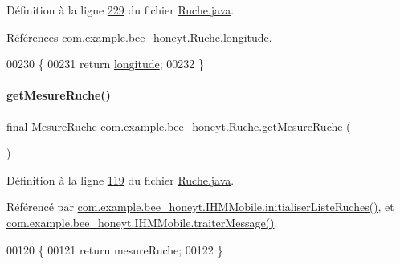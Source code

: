 Définition à la ligne \hyperlink{_ruche_8java_source_l00229}{229} du fichier \hyperlink{_ruche_8java_source}{Ruche.\+java}.



Références \hyperlink{_ruche_8java_source_l00035}{com.\+example.\+bee\+\_\+honeyt.\+Ruche.\+longitude}.


\begin{DoxyCode}
00230     \{
00231         \textcolor{keywordflow}{return} \hyperlink{classcom_1_1example_1_1bee__honeyt_1_1_ruche_aaeb7392ff8f3f26203e23f1dd57ae89f}{longitude};
00232     \}
\end{DoxyCode}
\mbox{\label{classcom_1_1example_1_1bee__honeyt_1_1_ruche_afab94785f8af31f6ce436394ab41c9f3}} 
\paragraph{\texorpdfstring{get\+Mesure\+Ruche()}{getMesureRuche()}}
{\footnotesize\ttfamily final \hyperlink{classcom_1_1example_1_1bee__honeyt_1_1_mesure_ruche}{Mesure\+Ruche} com.\+example.\+bee\+\_\+honeyt.\+Ruche.\+get\+Mesure\+Ruche (\begin{DoxyParamCaption}{ }\end{DoxyParamCaption})}



Définition à la ligne \hyperlink{_ruche_8java_source_l00119}{119} du fichier \hyperlink{_ruche_8java_source}{Ruche.\+java}.



Référencé par \hyperlink{_i_h_m_mobile_8java_source_l00170}{com.\+example.\+bee\+\_\+honeyt.\+I\+H\+M\+Mobile.\+initialiser\+Liste\+Ruches()}, et \hyperlink{_i_h_m_mobile_8java_source_l00374}{com.\+example.\+bee\+\_\+honeyt.\+I\+H\+M\+Mobile.\+traiter\+Message()}.


\begin{DoxyCode}
00120     \{
00121         \textcolor{keywordflow}{return} mesureRuche;
00122     \}
\end{DoxyCode}
\mbox{\label{classcom_1_1example_1_1bee__honeyt_1_1_ruche_a940047f0b4b8218e7faa7eafcc9665b2}} 
